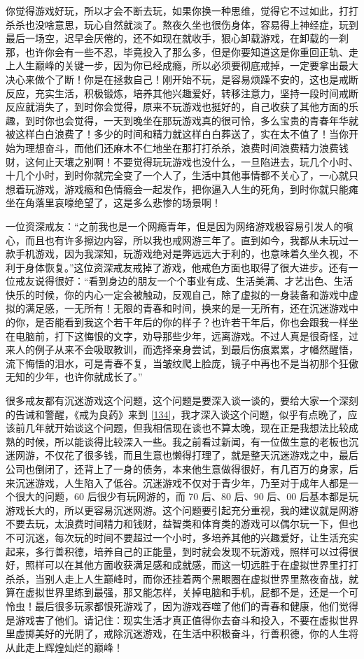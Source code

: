 你觉得游戏好玩，所以才会不断去玩，如果你换一种思维，觉得它不过如此，打打杀杀也没啥意思，玩心自然就淡了。熬夜久坐也很伤身体，容易得上神经症，玩到最后一场空，迟早会厌倦的，还不如现在就收手，狠心卸载游戏，在卸载的一刹那，也许你会有一些不忍，毕竟投入了那么多，但是你要知道这是你重回正轨、走上人生巅峰的关键一步，因为你已经成瘾，所以必须要彻底戒掉，一定要拿出最大决心来做个了断！你是在拯救自己！刚开始不玩，是容易烦躁不安的，这也是戒断反应，充实生活，积极锻炼，培养其他兴趣爱好，转移注意力，坚持一段时间戒断反应就消失了，到时你会觉得，原来不玩游戏也挺好的，自己收获了其他方面的乐趣，到时你也会觉得，一天到晚坐在那玩游戏真的很可怜，多么宝贵的青春年华就被这样白白浪费了！多少的时间和精力就这样白白葬送了，实在太不值了！当你开始为理想奋斗，而他们还麻木不仁地坐在那打打杀杀，浪费时间浪费精力浪费钱财，这何止天壤之别啊！不要觉得玩玩游戏也没什么，一旦陷进去，玩几个小时、十几个小时，到时你就完全变了一个人了，生活中其他事情都不关心了，一心就只想着玩游戏，游戏瘾和色情瘾会一起发作，把你逼入人生的死角，到时你就只能瘫坐在角落里哀嚎绝望了，这是多么悲惨的场景啊！

一位资深戒友：“之前我也是一个网瘾青年，但是因为网络游戏极容易引发人的嗔心，而且也有许多擦边内容，所以我也戒网游三年了。直到如今，我都从未玩过一款手机游戏，因为我深知，玩游戏绝对是弊远远大于利的，也意味着久坐久视，不利于身体恢复。”这位资深戒友戒掉了游戏，他戒色方面也取得了很大进步。还有一位戒友说得很好：“看到身边的朋友一个个事业有成、生活美满、才艺出色、生活快乐的时候，你的内心一定会被触动，反观自己，除了虚拟的一身装备和游戏中虚拟的满足感，一无所有！无限的青春和时间，换来的是一无所有，还在沉迷游戏中的你，是否能看到我这个若干年后的你的样子？也许若干年后，你也会跟我一样坐在电脑前，打下这悔恨的文字，劝导那些少年，远离游戏。不过人真是很奇怪，过来人的例子从来不会吸取教训，而选择亲身尝试，到最后伤痕累累，才幡然醒悟，流下悔悟的泪水，可是青春不复，当皱纹爬上脸庞，镜子中再也不是当初那个狂傲无知的少年，也许你就成长了。”

很多戒友都有沉迷游戏这个问题，这个问题是要深入谈一谈的，要给大家一个深刻的告诫和警醒，《戒为良药》来到 \ref{134}，我才深入谈这个问题，似乎有点晚了，应该前几年就开始谈这个问题，但我相信现在谈也不算太晚，现在正是我想法比较成熟的时候，所以能谈得比较深入一些。我之前看过新闻，有一位做生意的老板也沉迷网游，不仅花了很多钱，而且生意也懒得打理了，就是整天沉迷游戏之中，最后公司也倒闭了，还背上了一身的债务，本来他生意做得很好，有几百万的身家，后来沉迷游戏，人生陷入了低谷。沉迷游戏不仅对于青少年，乃至对于成年人都是一个很大的问题，60 后很少有玩网游的，而 70 后、80 后、90 后、00 后基本都是玩游戏长大的，所以更容易沉迷网游。这个问题要引起充分重视，我的建议就是网游不要去玩，太浪费时间精力和钱财，益智类和体育类的游戏可以偶尔玩一下，但也不可沉迷，每次玩的时间不要超过一个小时，多培养其他的兴趣爱好，让生活充实起来，多行善积德，培养自己的正能量，到时就会发现不玩游戏，照样可以过得很好，照样可以在其他方面收获满足感和成就感，而这一切远胜于在虚拟世界里打打杀杀，当别人走上人生巅峰时，而你还挂着两个黑眼圈在虚拟世界里熬夜奋战，就算在虚拟世界里练到最强，那又能怎样，关掉电脑和手机，屁都不是，还是一个可怜虫！最后很多玩家都恨死游戏了，因为游戏吞噬了他们的青春和健康，他们觉得是游戏害了他们。请记住：现实生活才真正值得你去奋斗和投入，不要在虚拟世界里虚掷美好的光阴了，戒除沉迷游戏，在生活中积极奋斗，行善积德，你的人生将从此走上辉煌灿烂的巅峰！

